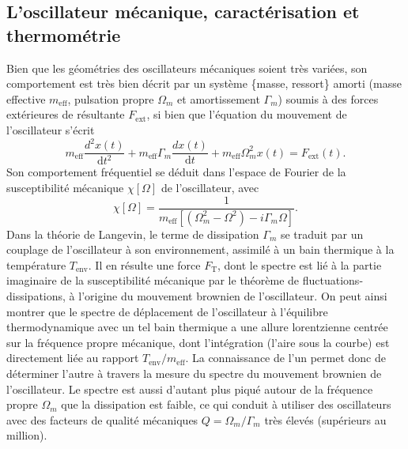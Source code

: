 \documentclass[12pt,a4paper]{article}
\renewcommand{\d}{\mathrm{d}}
\begin{document}
\subsection{L'oscillateur mécanique, caractérisation et thermométrie}

Bien que les géométries des oscillateurs mécaniques soient très variées, son comportement est très bien décrit par un système \{masse, ressort\} amorti (masse effective $m_\mathrm{eff}$, pulsation propre $\Omega_m$ et amortissement $\Gamma_m$) soumis à des forces extérieures de résultante $F_\mathrm{ext}$, si bien que l'équation du mouvement de l'oscillateur s'écrit
\begin{equation}
m_\mathrm{eff} \frac{d^2 x(t)}{\d t^2} + m_\mathrm{eff}\Gamma_m \frac{d x(t)}{\d t} + m_\mathrm{eff} \Omega_m^2 x(t) = F_\mathrm{ext}(t).
\end{equation}
Son comportement fréquentiel se déduit dans l'espace de Fourier de la susceptibilité mécanique $\chi[\Omega]$ de l'oscillateur, avec
\begin{equation}
\chi[\Omega] = \frac{1}{m_\mathrm{eff}[(\Omega_m^2-\Omega^2)-i\Gamma_m\Omega]}.
\end{equation}
Dans la théorie de Langevin, le terme de dissipation $\Gamma_m$ se traduit par un couplage de l'oscillateur à son environnement, assimilé à un bain thermique à la température $T_\mathrm{env}$.
Il en résulte une force $F_\mathrm{T}$, dont le spectre est lié à la partie imaginaire de la susceptibilité mécanique par le théorème de fluctuations-dissipations, à l'origine du mouvement brownien de l'oscillateur.
On peut ainsi montrer que le spectre de déplacement de l'oscillateur à l'équilibre thermodynamique avec un tel bain thermique a une allure lorentzienne centrée sur la fréquence propre mécanique, dont l'intégration (l'aire sous la courbe) est directement liée au rapport $T_\mathrm{env}/m_\mathrm{eff}$.
La connaissance de l'un permet donc de déterminer l'autre à travers la mesure du spectre du mouvement brownien de l'oscillateur.
Le spectre est aussi d'autant plus piqué autour de la fréquence propre $\Omega_m$ que la dissipation est faible, ce qui conduit à utiliser des oscillateurs avec des facteurs de qualité mécaniques $Q=\Omega_m/\Gamma_m$ très élevés (supérieurs au million).
\end{document}
